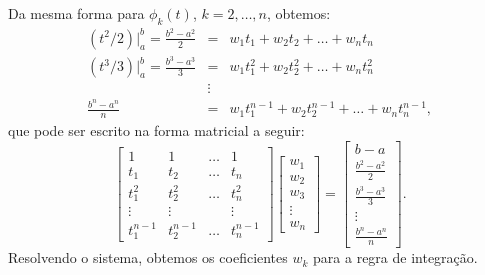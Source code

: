 Da mesma forma para $\phi_k(t)$, $k=2,\ldots,n$, obtemos:
\begin{eqnarray}
   (t^2/2)|_a^b = \frac{b^2-a^2}{2} &=&  w_1t_1  +w_2t_2  +\ldots +w_nt_n   \\
   (t^3/3)|_a^b = \frac{b^3-a^3}{3} &=&  w_1t_1^2+w_2t_2^2+\ldots +w_nt_n^2 \\
                              &\vdots&      \\
 \frac{b^{n}-a^{n}}{n}              &=&  w_1t_1^{n-1}+w_2t_2^{n-1}+\ldots +w_nt_n^{n-1},
\end{eqnarray}
que pode ser escrito na forma matricial a seguir:
\begin{equation}
\begin{bmatrix}
    1     &  1    & \ldots   &  1 \\
    t_1   &  t_2   & \ldots   & t_n \\
    t_1^2 &  t_2^2  & \ldots   & t_n^2 \\
    \vdots    &  \vdots     &    & \vdots   \\
    t_1^{n-1} & t_2^{n-1} & \ldots   & t_n^{n-1}
\end{bmatrix}
\begin{bmatrix}  w_1 \\ w_2\\ w_3  \\ \vdots   \\ w_n     \end{bmatrix}
=
\begin{bmatrix}  b-a  \\ \frac{b^2-a^2}{2} \\ \frac{b^3-a^3}{3} \\ \vdots  \\ \frac{b^{n}-a^{n}}{n}  \end{bmatrix}.
\end{equation}
Resolvendo o sistema, obtemos os coeficientes $w_k$ para a regra de integração.

